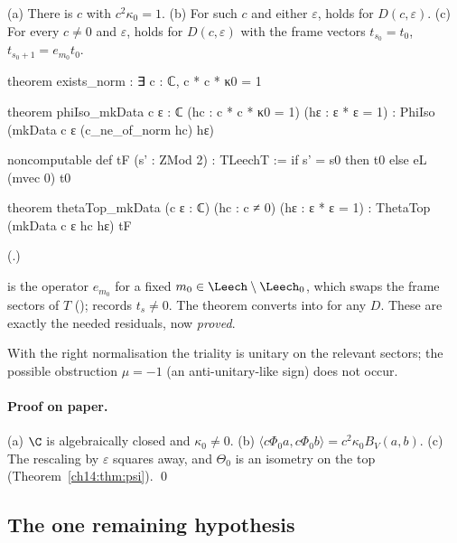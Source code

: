 \begin{theorem}\label{ch14:thm:isomk}
(a) There is $c$ with $c^2\kappa_0=1$.  (b) For such $c$ and either $\varepsilon$,  holds for
$D(c,\varepsilon)$.  (c) For every $c\ne0$ and $\varepsilon$,  holds for $D(c,\varepsilon)$ with the
frame vectors $t_{s_0}=t_0$, $t_{s_0+1}=e_{m_0}t_0$.
\end{theorem}
\begin{leancode}
theorem exists_norm : ∃ c : ℂ, c * c * κ0 = 1

theorem phiIso_mkData {c ε : ℂ} (hc : c * c * κ0 = 1) (hε : ε * ε = 1) :
    PhiIso (mkData c ε (c_ne_of_norm hc) hε)

noncomputable def tF (s' : ZMod 2) : TLeechT := if s' = s0 then t0 else eL (mvec 0) t0

theorem thetaTop_mkData (c ε : ℂ) (hc : c ≠ 0) (hε : ε * ε = 1) :
    ThetaTop (mkData c ε hc hε) tF
\end{leancode}
(.)

\begin{dictionary}
 is the operator $e_{m_0}$ for a fixed $m_0\in\Leech\setminus\Leech_0$, which swaps the frame
sectors of $T$ ();  records $t_{s}\ne0$.  The theorem 
converts  into  for any $D$.  These are exactly the needed residuals, now
\emph{proved}.
\end{dictionary}
\begin{physics}
With the right normalisation the triality is unitary on the relevant sectors; the possible obstruction $\mu=-1$ (an anti-unitary-like sign) does not occur.
\end{physics}


\paragraph{Proof on paper.}  (a) $\C$ is algebraically closed and $\kappa_0\ne0$.  (b)
$\langle c\Phi_0a,c\Phi_0b\rangle=c^2\kappa_0B_V(a,b)$.  (c) The rescaling by $\varepsilon$ squares away,
and $\Theta_0$ is an isometry on the top (Theorem~\ref{ch14:thm:psi}). \qed

\subsection{The one remaining hypothesis}

